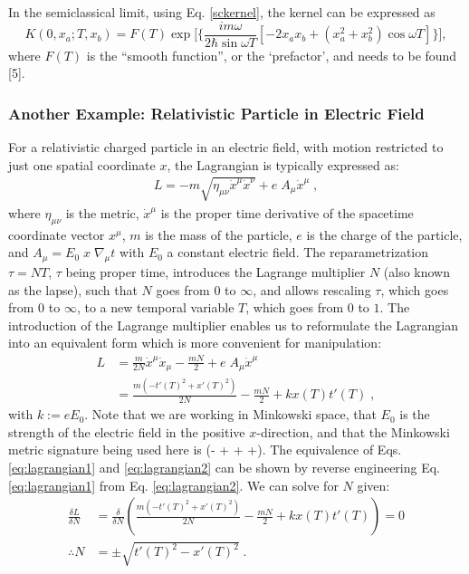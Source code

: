 \documentclass[12pt]{revtex4}
\begin{document}
In the semiclassical limit, using Eq. \ref{sckernel}, the kernel can be expressed as 
\[ K(0,x_a;T,x_b)=F(T) \exp \Bigg[{\Bigg\{\frac{im\omega}{2 \hbar \sin\omega T} [-2 x_a x_b + (x_a^2 + x_b^2) \cos \omega T]\Bigg\}}\Bigg],\]
where $F(T)$ is the ``smooth function'', or the `prefactor', and needs to be found [5]. 

\subsubsection{Another Example: Relativistic Particle in Electric Field}
For a relativistic charged particle in an electric field, with motion restricted to just one spatial coordinate $x$, the Lagrangian is typically expressed as:
\begin{align} \label{eq:lagrangian1}
L = - m \sqrt{\eta_{\mu \nu} \dot{x}^{\mu} \dot{x}^{\nu} } + e \; A_\mu \dot{x}^{\mu} \;,
\end{align}
where $\eta_{\mu \nu}$ is the metric, $\dot{x}^{\mu}$ is the proper time derivative of the spacetime coordinate vector $x^{\mu}$, $m$ is the mass of the particle, $e$ is the charge of the particle, and $A_\mu = E_0 \; x \; \nabla_\mu t$ with $E_0$ a constant electric field. The reparametrization $\tau = N T$, $\tau$ being proper time, introduces the Lagrange multiplier $N$ (also known as the lapse), such that $N$ goes from $0$ to $\infty$, and allows rescaling $\tau$, which goes from $0$ to $\infty$, to a new temporal variable $T$, which goes from $0$ to $1$. The introduction of the Lagrange multiplier enables us to reformulate the Lagrangian into an equivalent form which is more convenient for manipulation:
\begin{align} \label{eq:lagrangian2}
L &= \frac{m}{2N}\dot{x}^{\mu} \dot{x}_{\mu} -\frac{m N}{2} + e \; A_\mu \dot{x}^{\mu}  \\
\label{eq:lagrangian3}
 &= \frac{m (-t'(T)^2 + x'(T)^2)}{2N} -\frac{m N}{2} + k x(T) t'(T) \;, 
\end{align}
with $k := e E_0$. Note that we are working in Minkowski space, that $E_0$ is the strength of the electric field in the positive $x$-direction, and that the Minkowski metric signature being used here is (- + + +). The equivalence of Eqs. \ref{eq:lagrangian1} and \ref{eq:lagrangian2} can be shown by reverse engineering Eq. \ref{eq:lagrangian1} from Eq. \ref{eq:lagrangian2}. We can solve for $N$ given:
\begin{align}
\frac{\delta L}{\delta N} &= \frac{\delta}{\delta N} \left(\frac{m (-t'(T)^2 + x'(T)^2)}{2N} -\frac{m N}{2}+ k x(T) t'(T)\right) = 0 \\
\therefore N &= \pm\sqrt{t'(T)^2-x'(T)^2}  \;.
\end{align}
\end{document}
